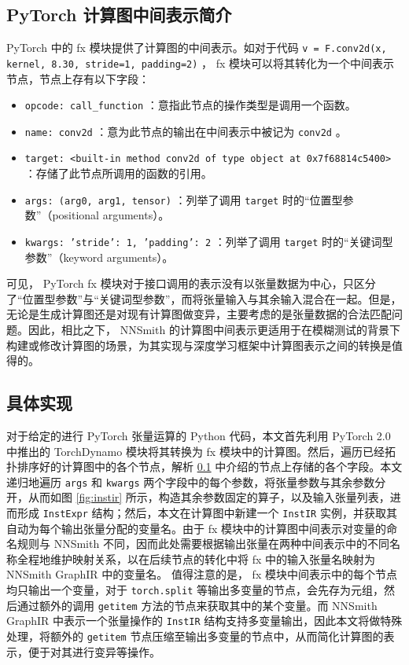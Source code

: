 \subsection{PyTorch 计算图中间表示简介}
\label{fxir}

PyTorch 中的 fx 模块提供了计算图的中间表示。如对于代码 \texttt{v = F.conv2d(x, kernel, 8.30, stride=1, padding=2)} ， fx 模块可以将其转化为一个中间表示节点，节点上存有以下字段：

\begin{itemize}
    \item \texttt{opcode: call\_function} ：意指此节点的操作类型是调用一个函数。
    \item \texttt{name: conv2d} ：意为此节点的输出在中间表示中被记为 \texttt{conv2d} 。
    \item \texttt{target: <built-in method conv2d of type object at 0x7f68814c5400>} ：存储了此节点所调用的函数的引用。
    \item \texttt{args: (arg0, arg1, tensor)} ：列举了调用 \texttt{target} 时的“位置型参数”（positional arguments）。
    \item \texttt{kwargs: {'stride': 1, 'padding': 2}} ：列举了调用 \texttt{target} 时的“关键词型参数”（keyword arguments）。
\end{itemize}

可见， PyTorch fx 模块对于接口调用的表示没有以张量数据为中心，只区分了“位置型参数”与“关键词型参数”，而将张量输入与其余输入混合在一起。但是，无论是生成计算图还是对现有计算图做变异，主要考虑的是张量数据的合法匹配问题。因此，相比之下， NNSmith 的计算图中间表示更适用于在模糊测试的背景下构建或修改计算图的场景，为其实现与深度学习框架中计算图表示之间的转换是值得的。

\subsection{具体实现}

对于给定的进行 PyTorch 张量运算的 Python 代码，本文首先利用 PyTorch 2.0 中推出的 TorchDynamo 模块将其转换为 fx 模块中的计算图。然后，遍历已经拓扑排序好的计算图中的各个节点，解析 \ref{fxir} 中介绍的节点上存储的各个字段。本文递归地遍历 \texttt{args} 和 \texttt{kwargs} 两个字段中的每个参数，将张量参数与其余参数分开，从而如图 \ref{fig:instir} 所示，构造其余参数固定的算子，以及输入张量列表，进而形成 \texttt{InstExpr} 结构；然后，本文在计算图中新建一个 \texttt{InstIR} 实例，并获取其自动为每个输出张量分配的变量名。由于 fx 模块中的计算图中间表示对变量的命名规则与 NNSmith 不同，因而此处需要根据输出张量在两种中间表示中的不同名称全程地维护映射关系，以在后续节点的转化中将 fx 中的输入张量名映射为 NNSmith GraphIR 中的变量名。
值得注意的是， fx 模块中间表示中的每个节点均只输出一个变量，对于 \texttt{torch.split} 等输出多变量的节点，会先存为元组，然后通过额外的调用 \texttt{getitem} 方法的节点来获取其中的某个变量。而 NNSmith GraphIR 中表示一个张量操作的 \texttt{InstIR} 结构支持多变量输出，因此本文将做特殊处理，将额外的 \texttt{getitem} 节点压缩至输出多变量的节点中，从而简化计算图的表示，便于对其进行变异等操作。

